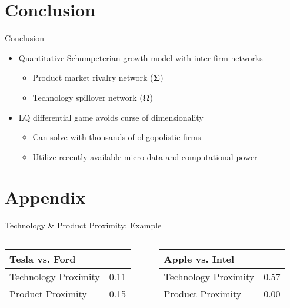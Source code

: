 \documentclass[
  10pt,               %
  aspectratio=169,     %
]{beamer}
\theoremstyle{plain}
\begin{document}
\section{Conclusion}
\begin{frame}{Conclusion}
  \begin{itemize}
    \item Quantitative Schumpeterian growth model with inter-firm networks
          \begin{itemize}
            \item Product market rivalry network ($\bm{\Sigma}$)
            \item Technology spillover network ($\bm{\Omega}$)
          \end{itemize}
          \medskip{}
    \item LQ differential game avoids curse of dimensionality
          \begin{itemize}
            \item Can solve with thousands of oligopolistic firms
            \item Utilize recently available micro data and computational power
          \end{itemize}
  \end{itemize}
\end{frame}

\appendix

\section{Appendix}

\begin{frame}{Technology \& Product Proximity: Example}
  \label{proximity_example}
  \begin{columns}[T]
    \begin{column}{0.45\textwidth}
      \centering
      \begin{tabular}{lr}
        \toprule
        Tesla vs. Ford       &      \\
        \midrule
        Technology Proximity & 0.11 \\
        Product Proximity    & 0.15 \\
        \bottomrule
      \end{tabular}
    \end{column}
    \begin{column}{0.45\textwidth}
      \centering
      \begin{tabular}{lr}
        \toprule
        Apple vs. Intel      &      \\
        \midrule
        Technology Proximity & 0.57 \\
        Product Proximity    & 0.00 \\
        \bottomrule
      \end{tabular}
    \end{column}
  \end{columns}
  \hyperlink{intro_quant}{}
\end{frame}
\end{document}
